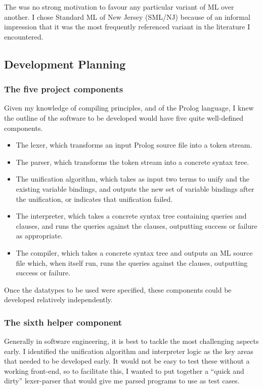 \documentclass[12pt]{article}
\begin{document}
The was no strong motivation to favour any particular variant of ML over another.
I chose Standard ML of New Jersey (SML/NJ) because of an informal impression that it was the most frequently referenced variant in the literature I encountered.

\subsection{Development Planning}

\subsubsection{The five project components}

Given my knowledge of compiling principles, and of the Prolog language, I knew the outline of the software to be developed would have five quite well-defined components.

\begin{itemize}
\item The lexer, which transforms an input Prolog source file into a token stream.
\item The parser, which transforms the token stream into a concrete syntax tree.
\item The unification algorithm, which takes as input two terms to unify and the existing variable bindings, and outputs the new set of variable bindings after the unification, or indicates that unification failed.
\item The interpreter, which takes a concrete syntax tree containing queries and clauses, and runs the queries against the clauses, outputting success or failure as appropriate.
\item The compiler, which takes a concrete syntax tree and outputs an ML source file which, when itself run, runs the queries against the clauses, outputting success or failure.
\end{itemize}

Once the datatypes to be used were specified, these components could be developed relatively independently.

\subsubsection{The sixth helper component}

Generally in software engineering, it is best to tackle the most challenging aspects early. 
I identified the unification algorithm and interpreter logic as the key areas that needed to be developed early. 
It would not be easy to test these without a working front-end, so to facilitate this, I wanted to put together a ``quick and dirty'' lexer-parser that would give me parsed programs to use as test cases.
\end{document}
